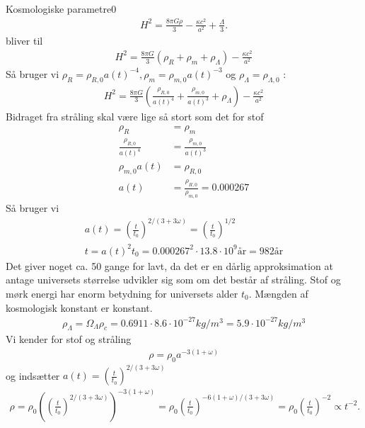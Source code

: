 \begin{opgave}{Kosmologiske parametre}{0}
	\opg 
	\begin{align}
	H^2=\frac{8\pi G \rho}{3}-\frac{\kappa c^2}{a^2}+\frac{\Lambda}{3}.
	\end{align}
	bliver til
	\begin{align}
	H^2=\frac{8\pi G}{3} (\rho_R+\rho_m+\rho_\Lambda)-\frac{\kappa c^2}{a^2} 
	\end{align}
	Så bruger vi $\rho_R=\rho_{R,0}a(t)^{-4}, \rho_m=\rho_{m,0}a(t)^{-3}$ og $\rho_\Lambda=\rho_{\Lambda,0}$ :
	\begin{align}
	H^2=\frac{8\pi G}{3} (\frac{\rho_{R,0}}{a(t)^4}+\frac{\rho_{m,0}}{a(t)^3}+\rho_\Lambda)-\frac{\kappa c^2}{a^2} 
	\end{align}
	\opg
	Bidraget fra stråling skal være lige så stort som det for stof
	\begin{align}
	\rho_R &= \rho_m\\
	\frac{\rho_{R,0}}{a(t)^4} &= \frac{\rho_{m,0}}{a(t)^3}\\
	\rho_{m,0} a(t) &= \rho_{R,0}\\
	a(t) &= \frac{\rho_{R,0}}{\rho_{m,0}} = 0.000267
	\end{align}
	Så bruger vi
	\begin{align}
		a(t)=\left(\frac{t}{t_0}\right)^{2/(3+3\omega)} = \left(\frac{t}{t_0}\right)^{1/2}\\
		t = a(t)^2 t_0 = 0.000267^2 \cdot 13.8\cdot10^9 \text{år} = 982 \text{år}
	\end{align}
	\opg Det giver noget ca. 50 gange for lavt, da det er en dårlig approksimation at antage universets størrelse udvikler sig som om det består af stråling. Stof og mørk energi har enorm betydning for universets alder $t_0$.
	\opg Mængden af kosmologisk konstant er konstant.
	\begin{align}
		\rho_\Lambda = \Omega_\Lambda \rho_c = 0.6911 \cdot 8.6\cdot 10^{-27} kg/m^3 = 5.9 \cdot 10^{-27} kg/m^3
	\end{align}
	\iffalse %
	Vi kender for stof og stråling
	\begin{align}
		\rho = \rho_0 a^{-3(1+\omega)}
	\end{align}
	 og indsætter $a(t)=\left(\frac{t}{t_0}\right)^{2/(3+3\omega)}$
	 \begin{align}
	 \rho = \rho_0 \left(\left(\frac{t}{t_0}\right)^{2/(3+3\omega)}\right)^{-3(1+\omega)} = \rho_0 \left(\frac{t}{t_0}\right)^{-6(1+\omega)/(3+3\omega)}
	 = \rho_0 \left(\frac{t}{t_0}\right)^{-2} \propto t^{-2}.
	 \end{align}

\end{opgave}
